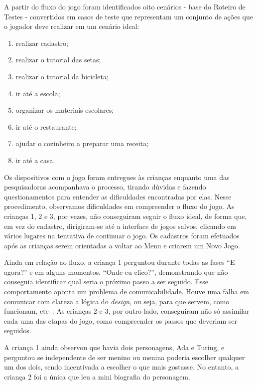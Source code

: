 A partir do fluxo do jogo foram identificados oito cenários - base do Roteiro de Testes - convertidos em casos de teste que representam um conjunto de ações que o jogador deve realizar em um cenário ideal: 

\begin{enumerate}
\item realizar cadastro; 
\item realizar o tutorial das setas; 
\item realizar o tutorial da bicicleta; 
\item ir até a escola; 
\item organizar os materiais escolares; 
\item ir até o restaurante; 
\item ajudar o cozinheiro a preparar uma receita; 
\item ir até a casa.
\end{enumerate}

Os dispositivos com o jogo foram entregues às crianças enquanto uma das pesquisadoras acompanhava o processo, tirando dúvidas e fazendo questionamentos para entender as dificuldades encontradas por elas. Nesse procedimento, observamos dificuldades em compreender o fluxo do jogo. As crianças 1, 2 e 3, por vezes, não conseguiram seguir o fluxo ideal, de forma que, em vez do cadastro, dirigiram-se até a interface de jogos salvos, clicando em vários lugares na tentativa de continuar o jogo. Os cadastros foram efetuados após as crianças serem orientadas a voltar ao Menu e criarem um Novo Jogo.

Ainda em relação ao fluxo, a criança 1 perguntou durante todas as fases “E agora?” e em alguns momentos, “Onde eu clico?”, demonstrando que não conseguia identificar qual seria o próximo passo a ser seguido. Esse comportamento aponta um problema de comunicabilidade. Houve uma falha em comunicar com clareza a lógica do \textit{design}, ou seja, para que servem, como funcionam, etc~\cite{grupo_de_pesquisa_em_engenharia_semiotica_serg_avaliacao_2012}. As crianças 2 e 3, por outro lado, conseguiram não só assimilar cada uma das etapas do jogo, como compreender os passos que deveriam ser seguidos.

A criança 1 ainda observou que havia dois personagens, Ada e Turing, e perguntou se independente de ser menino ou menina poderia escolher qualquer um dos dois, sendo incentivada a escolher o que mais gostasse. No entanto, a criança 2 foi a única que leu a mini biografia do personagem.


